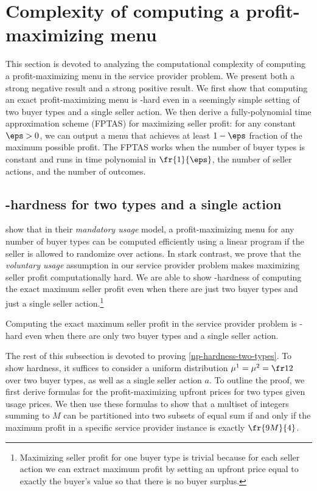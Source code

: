 \section{Complexity of computing a profit-maximizing menu} \label{complexity}

This section is devoted to analyzing the computational complexity of computing a profit-maximizing menu in the service provider problem. We present both a strong negative result and a strong positive result. We first show that computing an exact profit-maximizing menu is -hard even in a seemingly simple setting of two buyer types and a single seller action. We then derive a fully-polynomial time approximation scheme (FPTAS) for maximizing seller profit: for any constant $\eps>0$, we can output a menu that achieves at least $1-\eps$ fraction of the maximum possible profit. The FPTAS works when the number of buyer types is constant and runs in  time polynomial in $\fr{1}{\eps}$, the number of seller actions, and the number of outcomes.

\subsection{-hardness for two types and a single action} \label{hardness}

\citet{bernasconi2024agent} show that in their \emph{mandatory usage} model, a profit-maximizing menu  for any number of buyer types can be computed efficiently using a linear program if the seller is allowed to randomize over actions. In stark contrast, we prove that the \emph{voluntary usage} assumption in our service provider problem makes maximizing seller profit computationally hard. We are able to show -hardness of computing the exact maximum seller profit even when there are just two buyer types and just a single seller action.\footnote{Maximizing seller profit for one buyer type is trivial because for each seller action we can extract maximum profit by setting an upfront price equal to exactly the buyer's value so that there is no buyer surplus.}

\begin{theorem} \label{np-hardness-two-types}
Computing the exact maximum seller profit in the service provider problem is -hard even when there are only two buyer types and a single seller action.
\end{theorem}

The rest of this subsection is devoted to proving \cref{np-hardness-two-types}. To show hardness, it suffices to consider a uniform distribution $\mu^1 = \mu^2 = \fr12$ over two buyer types, as well as a single seller action $a$. To outline the proof, we first derive formulas for the profit-maximizing upfront prices for two types given usage prices. We then use these formulas to show that a multiset of integers summing to $M$ can be partitioned into two subsets of equal sum if and only if the maximum profit in a specific service provider instance is exactly $\fr{9M}{4}$.

